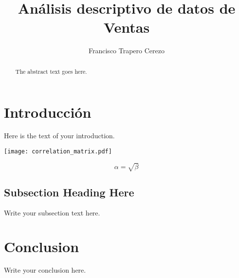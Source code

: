 \documentclass{article}
\begin{document}
\title{Análisis descriptivo de datos de Ventas}
\author{Francisco Trapero Cerezo}

\maketitle

\begin{abstract}
The abstract text goes here.
\end{abstract}

\section{Introducción}
Here is the text of your introduction.



\texttt{[image: correlation\_matrix.pdf]}
\clearpage


\begin{equation}
    \label{simple_equation}
    \alpha = \sqrt{ \beta }
\end{equation}

\subsection{Subsection Heading Here}
Write your subsection text here.

\section{Conclusion}
Write your conclusion here.
\end{document}
